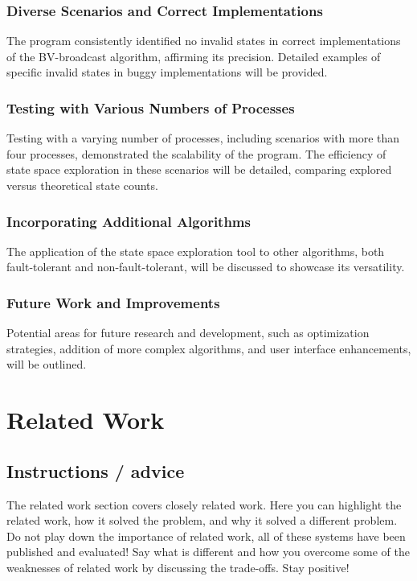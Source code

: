 \documentclass[a4paper,11pt,oneside]{report}
\begin{document}
\subsection{Diverse Scenarios and Correct Implementations}
The program consistently identified no invalid states in correct implementations of the BV-broadcast algorithm, affirming its precision. Detailed examples of specific invalid states in buggy implementations will be provided.

\subsection{Testing with Various Numbers of Processes}
Testing with a varying number of processes, including scenarios with more than four processes, demonstrated the scalability of the program. The efficiency of state space exploration in these scenarios will be detailed, comparing explored versus theoretical state counts.

\subsection{Incorporating Additional Algorithms}
The application of the state space exploration tool to other algorithms, both fault-tolerant and non-fault-tolerant, will be discussed to showcase its versatility.

\subsection{Future Work and Improvements}
Potential areas for future research and development, such as optimization strategies, addition of more complex algorithms, and user interface enhancements, will be outlined.



\chapter{Related Work}

\section{Instructions / advice}
The related work section covers closely related work. Here you can highlight
the related work, how it solved the problem, and why it solved a different
problem. Do not play down the importance of related work, all of these
systems have been published and evaluated! Say what is different and how
you overcome some of the weaknesses of related work by discussing the 
trade-offs. Stay positive!
\end{document}
